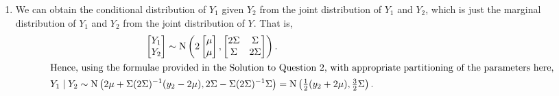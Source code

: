 \begin{enumerate}
         \begin{enumerate}
            \item We can obtain the conditional distribution of \( Y_{1} \) given \( Y_{2} \) from 
                  the joint distribution of \( Y_{1} \) and \( Y_{2} \), which is just the marginal 
                  distribution of \( Y_{1} \) and \( Y_{2} \) from the joint distribution of \( Y 
                  \).  That is, 
                  \begin{gather*}
                     \begin{bmatrix}
                        Y_{1} \\
                        Y_{2}
                     \end{bmatrix}\sim\operatorname{N}\left(
                     2
                     \begin{bmatrix}
                        \mu \\
                        \mu
                     \end{bmatrix},
                     \begin{bmatrix}
                        2\Sigma & \Sigma \\
                        \Sigma & 2\Sigma
                     \end{bmatrix}\right).
                     \\
                     \shortintertext{Hence, using the formulae provided in the Solution to Question 
                     2, with appropriate partitioning of the parameters here,}
                     Y_{1}\mid Y_{2}\sim\operatorname{N}\left(2\mu+\Sigma(2\Sigma)^{-1}(y_{2}-2\mu),
                     2\Sigma-\Sigma(2\Sigma)^{-1}\Sigma\right)=
                     \operatorname{N}\left(\tfrac{1}{2}(y_{2}+2\mu),\tfrac{3}{2}\Sigma\right).
                  \end{gather*}
         

\end{enumerate}
\end{enumerate}
